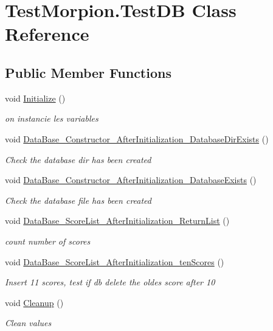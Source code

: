 \hypertarget{class_test_morpion_1_1_test_d_b}{}\section{Test\+Morpion.\+Test\+DB Class Reference}
\label{class_test_morpion_1_1_test_d_b}
\subsection*{Public Member Functions}
\begin{DoxyCompactItemize}
\item 
void \hyperlink{class_test_morpion_1_1_test_d_b_a4ac592a6b2dc14e87feb0154285126b4}{Initialize} ()
\begin{DoxyCompactList}\small\item\em on instancie les variables \end{DoxyCompactList}\item 
void \hyperlink{class_test_morpion_1_1_test_d_b_af72bbca8de5f0132a979983e1a562e9b}{Data\+Base\+\_\+\+Constructor\+\_\+\+After\+Initialization\+\_\+\+Database\+Dir\+Exists} ()
\begin{DoxyCompactList}\small\item\em Check the database dir has been created \end{DoxyCompactList}\item 
void \hyperlink{class_test_morpion_1_1_test_d_b_a19357f8672f88f76e209925f311bbeb2}{Data\+Base\+\_\+\+Constructor\+\_\+\+After\+Initialization\+\_\+\+Database\+Exists} ()
\begin{DoxyCompactList}\small\item\em Check the database file has been created \end{DoxyCompactList}\item 
void \hyperlink{class_test_morpion_1_1_test_d_b_aa0e09de9242070ffcdf4db726d75e611}{Data\+Base\+\_\+\+Score\+List\+\_\+\+After\+Initialization\+\_\+\+Return\+List} ()
\begin{DoxyCompactList}\small\item\em count number of scores \end{DoxyCompactList}\item 
void \hyperlink{class_test_morpion_1_1_test_d_b_a0b5f789271b53818bc9b546e14e9346f}{Data\+Base\+\_\+\+Score\+List\+\_\+\+After\+Initialization\+\_\+ten\+Scores} ()
\begin{DoxyCompactList}\small\item\em Insert 11 scores, test if db delete the oldes score after 10 \end{DoxyCompactList}\item 
void \hyperlink{class_test_morpion_1_1_test_d_b_abcd0e22acda3b5e66e9ecf5e2bc674cc}{Cleanup} ()
\begin{DoxyCompactList}\small\item\em Clean values \end{DoxyCompactList}\end{DoxyCompactItemize}


